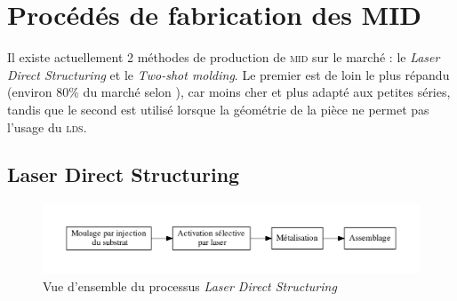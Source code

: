 \section{Procédés de fabrication des MID}
Il existe actuellement 2 méthodes de production de \textsc{mid} sur le marché :
le \emph{Laser Direct Structuring} et le \emph{Two-shot molding}. Le premier est
de loin le plus répandu (environ 80\% du marché selon \cite{mid-2011}), car moins
cher et plus adapté aux petites séries, tandis que le second est utilisé lorsque
la géométrie de la pièce ne permet pas l'usage du \textsc{lds}.

\subsection{Laser Direct Structuring}
\begin{figure}[h]
    \begin{center}
        \includegraphics[width=\textwidth]{lds_process}
        \caption{Vue d'ensemble du processus \emph{Laser Direct Structuring}}\label{fig:lds-process}
    \end{center}
\end{figure}

